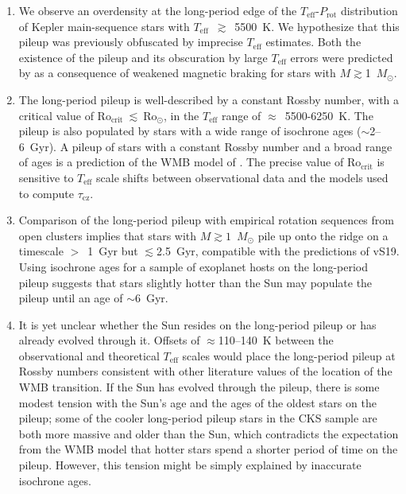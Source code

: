 \documentclass[trackchanges,twocolumn]{aastex631}
\newcommand{\taucz}{$\tau_\mathrm{cz}$\xspace}
\newcommand{\rocrit}{$\mathrm{Ro_{crit}}$\xspace}
\newcommand{\rocritfinal}{$\mathrm{Ro_{crit}}~\lesssim~\mathrm{Ro_\odot}$\xspace}
\newcommand{\teffmin}{5500~K\xspace}
\newcommand{\agerange}{$\sim$2--6~Gyr\xspace}
\newcommand{\jvs}{vS19\xspace}
\newcommand{\teff}{\ensuremath{T_{\mathrm{eff}}}\xspace}
\newcommand{\msun}{$M_\odot$\xspace}
\newcommand{\prot}{\ensuremath{P_\mathrm{rot}}\xspace}
\begin{document}
\begin{enumerate}
    \item We observe an overdensity at the long-period edge of the \teff-\prot distribution of Kepler main-sequence stars with \teff~$\gtrsim$~\teffmin. We hypothesize that this pileup was previously obfuscated by imprecise \teff estimates. Both the existence of the pileup and its obscuration by large \teff errors were predicted by \citet{vanSaders2019} as a consequence of weakened magnetic braking for stars with $M\gtrsim$1~\msun. 
    
    \item The long-period pileup is well-described by a constant Rossby number, with a critical value of \rocritfinal, in the \teff range of $\approx$~5500-6250~K. The pileup is also populated by stars with a wide range of isochrone ages (\agerange). A pileup of stars with a constant Rossby number and a broad range of ages is a prediction of the WMB model of \citet{vanSaders2016, vanSaders2019}. The precise value of \rocrit is sensitive to \teff scale shifts between observational data and the models used to compute \taucz. 

    \item Comparison of the long-period pileup with empirical rotation sequences from open clusters implies that stars with $M\gtrsim1$~\msun pile up onto the ridge on a timescale $>$~1~Gyr but $\lesssim$2.5~Gyr, compatible with the predictions of \jvs. Using isochrone ages for a sample of exoplanet hosts on the long-period pileup suggests that stars slightly hotter than the Sun may populate the pileup until an age of $\sim$6~Gyr.
    
    \item It is yet unclear whether the Sun resides on the long-period pileup or has already evolved through it. Offsets of $\approx$110--140~K between the observational and theoretical \teff scales would place the long-period pileup at Rossby numbers consistent with other literature values of the location of the WMB transition. If the Sun has evolved through the pileup, there is some modest tension with the Sun's age and the ages of the oldest stars on the pileup; some of the cooler long-period pileup stars in the CKS sample are both more massive and older than the Sun, which contradicts the expectation from the WMB model that hotter stars spend a shorter period of time on the pileup. However, this tension might be simply explained by inaccurate isochrone ages.
    

\end{enumerate}
\end{document}
